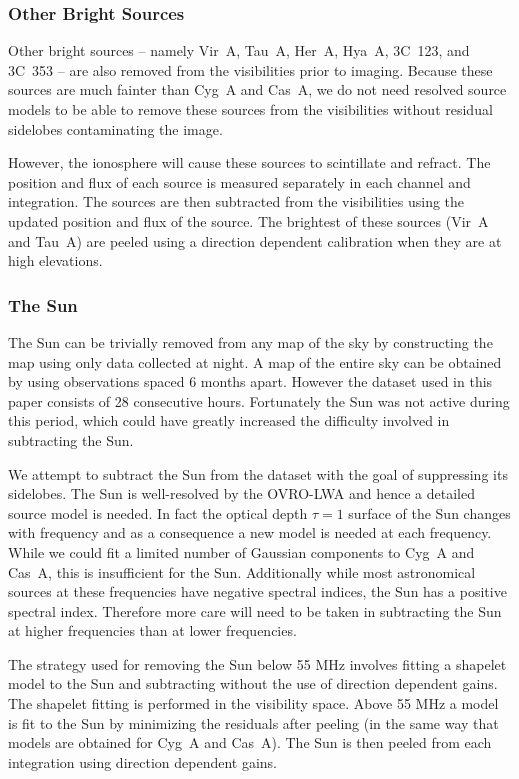 \documentclass[twocolumn]{aastex61}
\begin{document}
\subsubsection{Other Bright Sources}

Other bright sources -- namely Vir~A, Tau~A, Her~A, Hya~A, 3C~123, and 3C~353 -- are also removed
from the visibilities prior to imaging. Because these sources are much fainter than Cyg~A and Cas~A,
we do not need resolved source models to be able to remove these sources from the visibilities
without residual sidelobes contaminating the image.

However, the ionosphere will cause these sources to scintillate and refract. The position and flux
of each source is measured separately in each channel and integration. The sources are then
subtracted from the visibilities using the updated position and flux of the source. The brightest of
these sources (Vir~A and Tau~A) are peeled using a direction dependent calibration when they are at
high elevations.

\subsubsection{The Sun}

The Sun can be trivially removed from any map of the sky by constructing the map using only data
collected at night. A map of the entire sky can be obtained by using observations spaced 6 months
apart.  However the dataset used in this paper consists of 28 consecutive hours. Fortunately the Sun
was not active during this period, which could have greatly increased the difficulty involved in
subtracting the Sun.

We attempt to subtract the Sun from the dataset with the goal of suppressing its sidelobes.  The Sun
is well-resolved by the OVRO-LWA and hence a detailed source model is needed. In fact the optical
depth $\tau=1$ surface of the Sun changes with frequency and as a consequence a new model is needed
at each frequency. While we could fit a limited number of Gaussian components to Cyg~A and Cas~A,
this is insufficient for the Sun.  Additionally while most astronomical sources at these frequencies
have negative spectral indices, the Sun has a positive spectral index. Therefore more care will need
to be taken in subtracting the Sun at higher frequencies than at lower frequencies.

The strategy used for removing the Sun below 55 MHz involves fitting a shapelet
\citep{2003MNRAS.338...35R} model to the Sun and subtracting without the use of direction dependent
gains. The shapelet fitting is performed in the visibility space. Above 55 MHz a model is fit to the
Sun by minimizing the residuals after peeling (in the same way that models are obtained for Cyg~A
and Cas~A). The Sun is then peeled from each integration using direction dependent gains.
\end{document}
